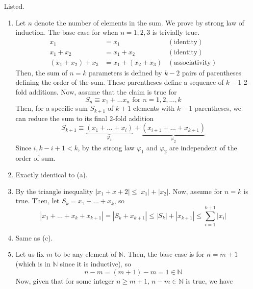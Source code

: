   \begin{solution}
    Listed. 
    \begin{enumerate}
      \item Let $n$ denote the number of elements in the sum. We prove by strong law of induction. The base case for when $n=1, 2, 3$ is trivially true. 
      \begin{align*}
        x_1 & = x_1 & (\text{identity}) \\
        x_1 + x_2 & = x_1 + x_2 & (\text{identity}) \\
        (x_1 + x_2) + x_3 & = x_1 + (x_2 + x_3) & (\text{associativity}) 
      \end{align*}
      Then, the sum of $n=k$ parameters is defined by $k-2$ pairs of parentheses defining the order of the sum. These parentheses define a sequence of $k-1$ 2-fold additions. Now, assume that the claim is true for 
      \begin{equation}
        S_n \equiv x_1 + \ldots x_n \text{ for } n = 1, 2, \ldots, k
      \end{equation}
      Then, for a specific sum $S_{k+1}$ of $k+1$ elements with $k-1$ parentheses, we can reduce the sum to its final 2-fold addition 
      \begin{equation}
        S_{k+1} \equiv \underbrace{(x_1 + \ldots + x_i)}_{\varphi_1}  + \underbrace{(x_{i+1} + \ldots + x_{k+1})}_{\varphi_2}
      \end{equation}
      Since $i, k-i+1 < k$, by the strong law $\varphi_1$ and $\varphi_2$ are independent of the order of sum. 
      \item Exactly identical to (a). 
      \item By the triangle inequality $|x_1 + x+2| \leq |x_1| + |x_2|$. Now, assume for $n=k$ is true. Then, let $S_k = x_1 + \ldots + x_k$, so 
      \begin{equation}
        |x_1 + \ldots + x_k + x_{k+1}| = |S_k + x_{k+1}| \leq |S_k| + |x_{k+1}| \leq \sum_{i=1}^{k+1} |x_{i}|
      \end{equation}
      \item Same as (c). 
      \item Let us fix $m$ to be any element of $\mathbb{N}$. Then, the base case is for $n = m + 1$ (which is in $\mathbb{N}$ since it is inductive), so 
      \begin{equation}
        n - m = (m + 1) - m = 1 \in \mathbb{N}
      \end{equation}
      Now, given that for some integer $n \geq m+1$, $n - m \in \mathbb{N}$ is true, we have 

\end{enumerate}
\end{solution}
